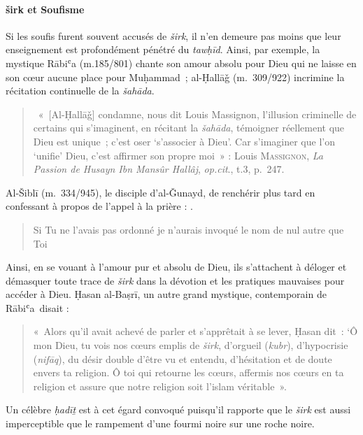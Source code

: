 \paragraph{širk et Soufisme } Si les soufis furent souvent accusés de \emph{širk}, il n'en demeure pas
moins que leur enseignement est profondément pénétré du \emph{tawḥīd}.
Ainsi, par exemple, la mystique Rābiʿa (m.185/801) chante son amour
absolu pour Dieu qui ne laisse en son cœur aucune place pour
Muḥammad~; al-Ḥallāǧ (m.~309/922) 
incrimine la récitation continuelle de la \emph{šahāda}.
\begin{quote}
    {~«~{[}Al-Ḥallāǧ{]}
  condamne, nous dit Louis Massignon, l'illusion criminelle de certains
  qui s'imaginent, en récitant la \emph{šahāda}, témoigner réellement
  que Dieu est unique~; c'est oser `s'associer à Dieu'. Car s'imaginer
  que l'on `unifie' Dieu, c'est affirmer son propre moi~» : Louis
  \textsc{Massignon}, \emph{La Passion de Husayn Ibn Mansûr Hallâj},
  \emph{op.cit}., t.3, p.~247.}
\end{quote}

Al-Šiblī (m.~334/945), le disciple
d'al-Ǧunayd, de renchérir plus tard en confessant à propos de l'appel à
la prière : .
\begin{quote}
    Si Tu ne l'avais pas ordonné je n'aurais invoqué le nom de
nul autre que Toi
\end{quote}
 Ainsi, en se vouant à l'amour pur et absolu
de Dieu, ils s'attachent à déloger et démasquer toute trace de
\emph{širk} dans la dévotion et les pratiques mauvaises pour accéder à
Dieu. Ḥasan al-Baṣrī, un autre grand mystique, contemporain de
Rābiʿa~disait : 
\begin{quote}
    «~Alors qu'il avait achevé de parler et s'apprêtait à se
lever, Ḥasan dit~: `Ô mon Dieu, tu vois nos cœurs emplis de \emph{širk},
d'orgueil (\emph{kubr}), d'hypocrisie (\emph{nifāq}), du désir double
d'être vu et entendu, d'hésitation et de doute envers ta religion. Ô toi
qui retourne les cœurs, affermis nos cœurs en ta religion et assure que
notre religion soit l'islam véritable~».
\end{quote}
 Un
célèbre \emph{ḥadīṯ} est à cet égard convoqué puisqu'il rapporte que le
\emph{širk} est aussi imperceptible que le rampement d'une fourmi noire
sur une roche noire.


